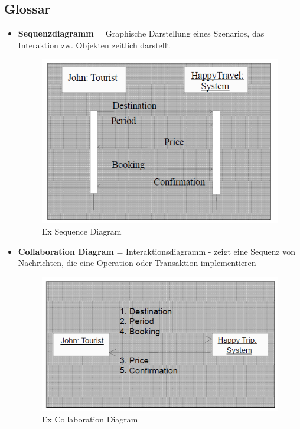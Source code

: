\subsection{Glossar}
\begin{itemize}
	\item \textbf{Sequenzdiagramm} = Graphische Darstellung eines Szenarios, das Interaktion zw. Objekten zeitlich darstellt
	\begin{figure}[!h]
		\centering
		\includegraphics[scale=0.5]{img/ex_sequence_diagram.png}
		\caption{Ex Sequence Diagram}
	\end{figure}
	\item \textbf{Collaboration Diagram} = Interaktionsdiagramm - zeigt eine Sequenz von Nachrichten, die eine Operation oder Transaktion implementieren
	\begin{figure}[!h]
		\centering
		\includegraphics[scale=0.5]{img/ex_collaboration_diagram.png}
		\caption{Ex Collaboration Diagram}
	\end{figure}
\end{itemize}

